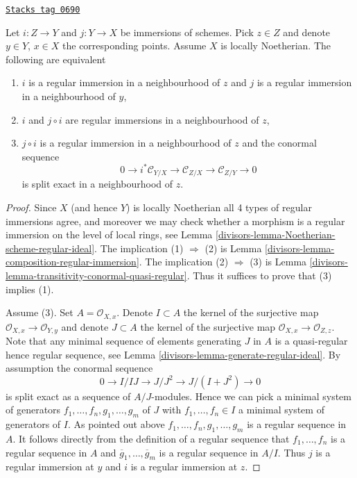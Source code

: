 \begin{lemma}
\label{divisors-lemma-extra-permanence-regular-immersion-noetherian}
\href{https://stacks.math.columbia.edu/tag/0690}{\texttt{Stacks tag 0690}}

Let $i : Z \to Y$ and $j : Y \to X$ be immersions of schemes.
Pick $z \in Z$ and denote $y \in Y$, $x \in X$ the corresponding points.
Assume $X$ is locally Noetherian.
The following are equivalent
\begin{enumerate}
\item $i$ is a regular immersion in a neighbourhood of $z$ and $j$
is a regular immersion in a neighbourhood of $y$,
\item $i$ and $j \circ i$ are regular immersions in a neighbourhood of $z$,
\item $j \circ i$ is a regular immersion in a neighbourhood of $z$ and the
conormal sequence
$$
0 \to i^*\mathcal{C}_{Y/X} \to
\mathcal{C}_{Z/X} \to
\mathcal{C}_{Z/Y} \to 0
$$
is split exact in a neighbourhood of $z$.
\end{enumerate}
\end{lemma}

\begin{proof}

Since $X$ (and hence $Y$) is locally Noetherian all 4 types of regular
immersions agree, and moreover we may check whether a morphism is a
regular immersion on the level of local rings, see
Lemma \ref{divisors-lemma-Noetherian-scheme-regular-ideal}.
The implication (1) $\Rightarrow$ (2) is
Lemma \ref{divisors-lemma-composition-regular-immersion}.
The implication (2) $\Rightarrow$ (3) is
Lemma \ref{divisors-lemma-transitivity-conormal-quasi-regular}.
Thus it suffices to prove that (3) implies (1).

\medskip\noindent
Assume (3). Set $A = \mathcal{O}_{X, x}$. Denote $I \subset A$ the kernel
of the surjective map $\mathcal{O}_{X, x} \to \mathcal{O}_{Y, y}$ and
denote $J \subset A$ the kernel
of the surjective map $\mathcal{O}_{X, x} \to \mathcal{O}_{Z, z}$.
Note that any minimal sequence of elements generating $J$ in $A$
is a quasi-regular hence regular sequence, see
Lemma \ref{divisors-lemma-generate-regular-ideal}.
By assumption the conormal sequence
$$
0 \to I/IJ \to J/J^2 \to J/(I + J^2) \to 0
$$
is split exact as a sequence of $A/J$-modules. Hence we can pick
a minimal system of generators $f_1, \ldots, f_n, g_1, \ldots, g_m$
of $J$ with $f_1, \ldots, f_n \in I$ a minimal system of generators of $I$.
As pointed out above $f_1, \ldots, f_n, g_1, \ldots, g_m$ is a regular
sequence in $A$. It follows directly from the definition of a regular
sequence that $f_1, \ldots, f_n$ is a regular sequence in $A$ and
$\overline{g}_1, \ldots, \overline{g}_m$ is a regular sequence in
$A/I$. Thus $j$ is a regular immersion at $y$ and $i$ is a regular
immersion at $z$.
\end{proof}

